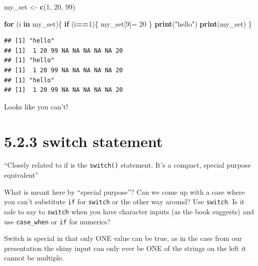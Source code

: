 \documentclass[]{book}
\newenvironment{Shaded}{\begin{snugshade}}{\end{snugshade}}
\newcommand{\ControlFlowTok}[1]{\textcolor[rgb]{0.13,0.29,0.53}{\textbf{#1}}}
\newcommand{\DecValTok}[1]{\textcolor[rgb]{0.00,0.00,0.81}{#1}}
\newcommand{\KeywordTok}[1]{\textcolor[rgb]{0.13,0.29,0.53}{\textbf{#1}}}
\newcommand{\NormalTok}[1]{#1}
\newcommand{\OperatorTok}[1]{\textcolor[rgb]{0.81,0.36,0.00}{\textbf{#1}}}
\newcommand{\StringTok}[1]{\textcolor[rgb]{0.31,0.60,0.02}{#1}}
\begin{document}
\begin{Shaded}
\begin{Highlighting}[]
\NormalTok{my_set <-}\StringTok{ }\KeywordTok{c}\NormalTok{(}\DecValTok{1}\NormalTok{, }\DecValTok{20}\NormalTok{, }\DecValTok{99}\NormalTok{)}

\ControlFlowTok{for}\NormalTok{ (i }\ControlFlowTok{in}\NormalTok{ my_set)\{}
  \ControlFlowTok{if}\NormalTok{ (i}\OperatorTok{==}\DecValTok{1}\NormalTok{)\{}
\NormalTok{    my_set[}\DecValTok{9}\NormalTok{]=}\StringTok{ }\DecValTok{20}
\NormalTok{    \}}
  \KeywordTok{print}\NormalTok{(}\StringTok{"hello"}\NormalTok{)}
  \KeywordTok{print}\NormalTok{(my_set)}
\NormalTok{  \}}
\end{Highlighting}
\end{Shaded}

\begin{verbatim}
## [1] "hello"
## [1]  1 20 99 NA NA NA NA NA 20
## [1] "hello"
## [1]  1 20 99 NA NA NA NA NA 20
## [1] "hello"
## [1]  1 20 99 NA NA NA NA NA 20
\end{verbatim}

Looks like you can't!

\hypertarget{switch-statement}{%
\section*{5.2.3 switch statement}\label{switch-statement}}

``Closely related to if is the \texttt{switch()} statement. It's a compact, special purpose equivalent''

What is meant here by ``special purpose''? Can we come up with a case where you can't substitute \texttt{if} for \texttt{switch} or the other way around? Use \texttt{switch}. Is it safe to say to \texttt{switch} when you have character inputs (as the book suggests) and use \texttt{case\_when} or \texttt{if} for numerics?

Switch is special in that only ONE value can be true, as in the case from our presentation the shiny input can only ever be ONE of the strings on the left it cannot be multiple.

\begin{Shaded}
\end{Shaded}
\end{document}
